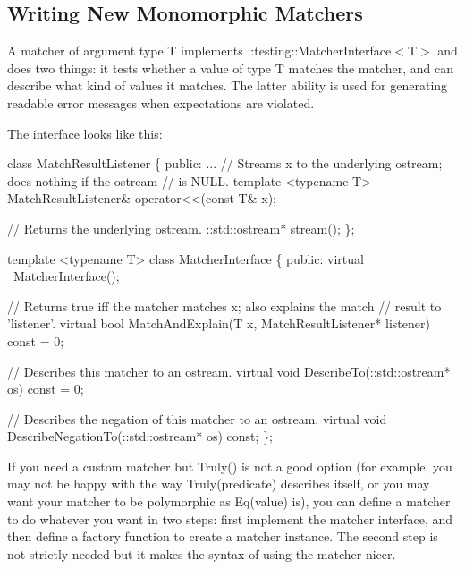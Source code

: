 \subsection*{Writing New Monomorphic Matchers}

A matcher of argument type {\ttfamily T} implements {\ttfamily \+::testing\+::\+Matcher\+Interface$<$T$>$} and does two things\+: it tests whether a value of type {\ttfamily T} matches the matcher, and can describe what kind of values it matches. The latter ability is used for generating readable error messages when expectations are violated.

The interface looks like this\+:


\begin{DoxyCode}
\textcolor{keyword}{class }MatchResultListener \{
 \textcolor{keyword}{public}:
  ...
  \textcolor{comment}{// Streams x to the underlying ostream; does nothing if the ostream}
  \textcolor{comment}{// is NULL.}
  \textcolor{keyword}{template} <\textcolor{keyword}{typename} T>
  MatchResultListener& operator<<(\textcolor{keyword}{const} T& x);

  \textcolor{comment}{// Returns the underlying ostream.}
  ::std::ostream* stream();
\};

\textcolor{keyword}{template} <\textcolor{keyword}{typename} T>
\textcolor{keyword}{class }MatcherInterface \{
 \textcolor{keyword}{public}:
  \textcolor{keyword}{virtual} ~MatcherInterface();

  \textcolor{comment}{// Returns true iff the matcher matches x; also explains the match}
  \textcolor{comment}{// result to 'listener'.}
  \textcolor{keyword}{virtual} \textcolor{keywordtype}{bool} MatchAndExplain(T x, MatchResultListener* listener) \textcolor{keyword}{const} = 0;

  \textcolor{comment}{// Describes this matcher to an ostream.}
  \textcolor{keyword}{virtual} \textcolor{keywordtype}{void} DescribeTo(::std::ostream* os) \textcolor{keyword}{const} = 0;

  \textcolor{comment}{// Describes the negation of this matcher to an ostream.}
  \textcolor{keyword}{virtual} \textcolor{keywordtype}{void} DescribeNegationTo(::std::ostream* os) \textcolor{keyword}{const};
\};
\end{DoxyCode}


If you need a custom matcher but {\ttfamily Truly()} is not a good option (for example, you may not be happy with the way {\ttfamily Truly(predicate)} describes itself, or you may want your matcher to be polymorphic as {\ttfamily Eq(value)} is), you can define a matcher to do whatever you want in two steps\+: first implement the matcher interface, and then define a factory function to create a matcher instance. The second step is not strictly needed but it makes the syntax of using the matcher nicer.

